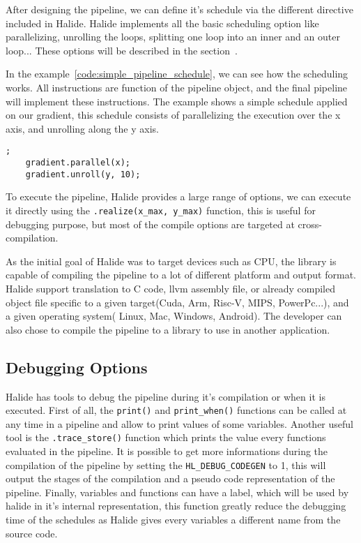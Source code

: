 	After designing the  pipeline, we can define it's schedule via the different directive included in Halide. Halide implements all the basic scheduling option like parallelizing, unrolling the loops, splitting one loop into an inner and an outer loop... These options will be described in the section~. 

	In the example~\ref{code:simple_pipeline_schedule}, we can see how the scheduling works. All instructions are function of the pipeline object, and the final pipeline will implement these instructions. The example shows a simple schedule applied on our gradient, this schedule consists of parallelizing the execution over the x axis, and unrolling along the y axis.

	\begin{lstlisting}[caption={Simple Pipeline Example}, captionpos=b,label={code:simple_pipeline_schedule}];
	gradient.parallel(x);
	gradient.unroll(y, 10);
	\end{lstlisting}


	To execute the pipeline, Halide provides a large range of options, we can execute it directly using the \verb|.realize(x_max, y_max)| function, this is useful for debugging purpose, but most of the compile options are targeted at cross-compilation.
	
	As the initial goal of Halide was to target devices such as CPU, the library is capable of compiling the pipeline to a lot of different platform and output format. Halide support translation to C code, llvm assembly file, or already compiled object file specific to a given target(Cuda, Arm, Risc-V, MIPS, PowerPc...), and a given operating system( Linux, Mac, Windows, Android). The developer can also chose to compile the pipeline to a library to use in another application.

\subsection{Debugging Options}
	Halide has tools to debug the pipeline during it's compilation or when it is executed. First of all, the \verb|print()| and \verb|print_when()| functions can be called at any time in a pipeline and allow to print values of some variables. Another useful tool is the \verb|.trace_store()| function which prints the value every  functions evaluated in the pipeline. It is possible to get more informations during the compilation of the pipeline by setting the \verb|HL_DEBUG_CODEGEN| to 1, this will output the stages of the compilation and a pseudo code representation of the pipeline.
	Finally, variables and functions can have a label, which will be used by halide in it's internal representation, this function greatly reduce the debugging time of the schedules as Halide gives every variables a different name from the source code.


